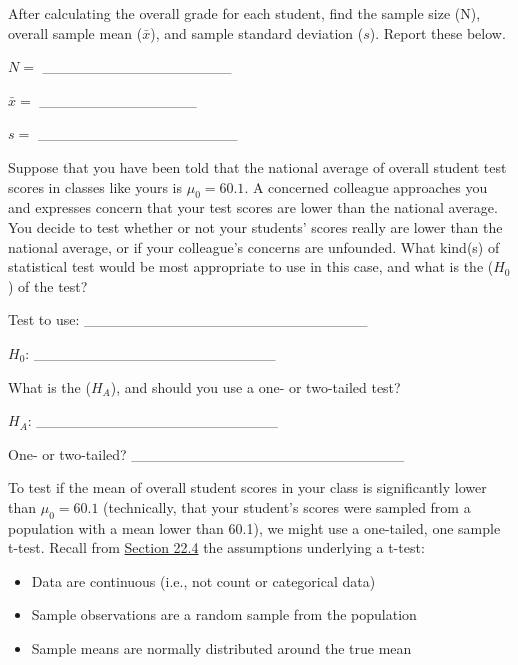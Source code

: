 \documentclass[
  openany]{krantz}
\providecommand{\tightlist}{%
  \setlength{\itemsep}{0pt}\setlength{\parskip}{0pt}}
\begin{document}
After calculating the overall grade for each student, find the sample size (N), overall sample mean (\(\bar{x}\)), and sample standard deviation (\(s\)).
Report these below.

\(N =\) \_\_\_\_\_\_\_\_\_\_\_\_\_\_\_\_\_\_

\(\bar{x} =\) \_\_\_\_\_\_\_\_\_\_\_\_\_\_\_

\(s =\) \_\_\_\_\_\_\_\_\_\_\_\_\_\_\_\_\_\_\_

Suppose that you have been told that the national average of overall student test scores in classes like yours is \(\mu_{0} = 60.1\).
A concerned colleague approaches you and expresses concern that your test scores are lower than the national average.
You decide to test whether or not your students' scores really are lower than the national average, or if your colleague's concerns are unfounded.
What kind(s) of statistical test would be most appropriate to use in this case, and what is the  (\(H_{0}\)) of the test?

Test to use: \_\_\_\_\_\_\_\_\_\_\_\_\_\_\_\_\_\_\_\_\_\_\_\_\_\_\_

\(H_{0}\): \_\_\_\_\_\_\_\_\_\_\_\_\_\_\_\_\_\_\_\_\_\_\_

What is the  (\(H_{A}\)), and should you use a one- or two-tailed test?

\(H_{A}\): \_\_\_\_\_\_\_\_\_\_\_\_\_\_\_\_\_\_\_\_\_\_\_

One- or two-tailed? \_\_\_\_\_\_\_\_\_\_\_\_\_\_\_\_\_\_\_\_\_\_\_\_\_\_

To test if the mean of overall student scores in your class is significantly lower than \(\mu_{0} = 60.1\) (technically, that your student's scores were sampled from a population with a mean lower than 60.1), we might use a one-tailed, one sample t-test.
Recall from \protect\hyperlink{assumptions-of-t-tests}{Section 22.4} the assumptions underlying a t-test:

\begin{itemize}
\tightlist
\item
  Data are continuous (i.e., not count or categorical data)
\item
  Sample observations are a random sample from the population
\item
  Sample means are normally distributed around the true mean
\end{itemize}
\end{document}
